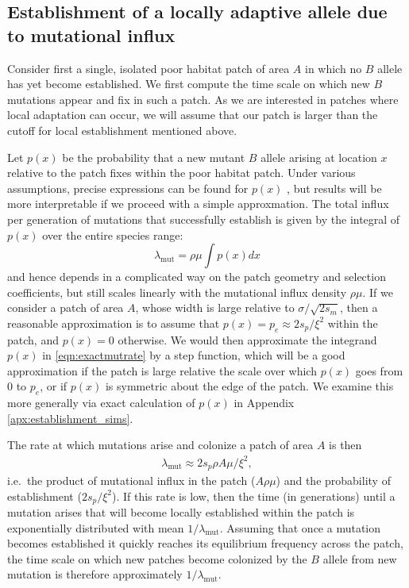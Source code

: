 \documentclass{article}
\newcommand{\mutrate}{\lambda_\text{mut}}
\begin{document}
\subsection{Establishment of a locally adaptive allele due to mutational influx}
\label{ss:patchymutation}

Consider first a single, isolated poor habitat patch of area $A$ in which no $B$ allele has yet become established. 
We first compute the time scale on which new $B$ mutations appear and fix in such a patch.
As we are interested in patches where local adaptation can occur,
we will assume that our patch is larger than the cutoff for local establishment 
mentioned above.

Let $p(x)$ be the probability that a new mutant $B$ allele arising at location $x$
relative to the patch fixes within the poor habitat patch.
Under various assumptions, precise expressions can be found for $p(x)$ \citep{barton1987establishment},
but results will be more interpretable if we proceed with a simple approxmation.
The total influx per generation of mutations that successfully establish is given by the
integral of $p(x)$ over the entire species range:
\begin{equation}
  \mutrate = \rho \mu \int p(x) dx \label{eqn:exactmutrate}
\end{equation}
and hence depends in a complicated way on the patch geometry and selection coefficients,
but still scales linearly with the mutational influx density $\rho \mu$.
If we consider a patch of area $A$, whose width is large relative to $\sigma/\sqrt{2s_m}$, 
then a reasonable approximation is to assume that $p(x) = p_e \approx 2 s_p / \xi^2$ within the patch, and $p(x) = 0$ otherwise.
We would then approximate the integrand $p(x)$ in \eqref{eqn:exactmutrate} by a step function,
which will be a good approximation if the patch is large relative the scale over which $p(x)$ goes from 0 to $p_e$,
or if $p(x)$ is symmetric about the edge of the patch.
We examine this more generally via exact calculation of $p(x)$ in Appendix \ref{apx:establishment_sims}.

The rate at which mutations arise and colonize a patch of area $A$ is then
\begin{align} \label{eqn:mutrate}
  \mutrate %
  \approx 2 s_p \rho A \mu / \xi^2,
\end{align}
i.e.\ the product of mutational influx in the patch ($A\rho\mu$) and the probability of establishment ($2s_p/\xi^2$).
If this rate is low, then the time (in generations) until a mutation arises that
will become locally established within the patch is exponentially distributed with mean $1/\mutrate$.  
Assuming that once a mutation becomes established it quickly reaches its equilibrium frequency across the patch, 
the time scale on which new patches become colonized by the $B$ allele from new mutation is therefore approximately $1/\mutrate$.
\end{document}
